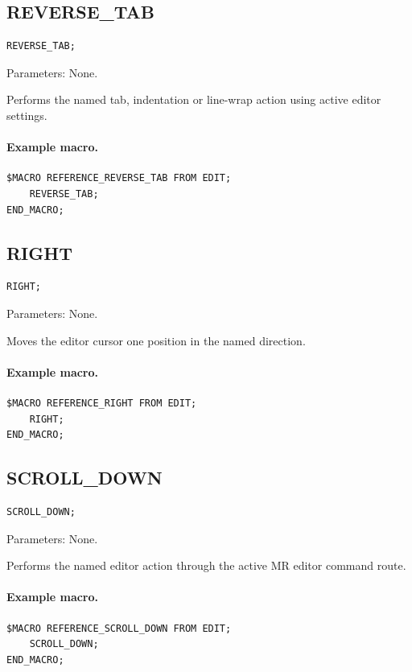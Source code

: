 \documentclass[a4paper,10pt,twoside,openany]{book}
\begin{document}
\label{prim:procedure-reverse-tab}
\subsection*{REVERSE\_TAB}
\begin{verbatim}
REVERSE_TAB;
\end{verbatim}
Parameters: None.

Performs the named tab, indentation or line-wrap action using active editor settings.

\paragraph{Example macro.}
\begin{verbatim}
$MACRO REFERENCE_REVERSE_TAB FROM EDIT;
    REVERSE_TAB;
END_MACRO;
\end{verbatim}

\label{prim:procedure-right}
\subsection*{RIGHT}
\begin{verbatim}
RIGHT;
\end{verbatim}
Parameters: None.

Moves the editor cursor one position in the named direction.

\paragraph{Example macro.}
\begin{verbatim}
$MACRO REFERENCE_RIGHT FROM EDIT;
    RIGHT;
END_MACRO;
\end{verbatim}

\label{prim:procedure-scroll-down}
\subsection*{SCROLL\_DOWN}
\begin{verbatim}
SCROLL_DOWN;
\end{verbatim}
Parameters: None.

Performs the named editor action through the active MR editor command route.

\paragraph{Example macro.}
\begin{verbatim}
$MACRO REFERENCE_SCROLL_DOWN FROM EDIT;
    SCROLL_DOWN;
END_MACRO;
\end{verbatim}
\end{document}
